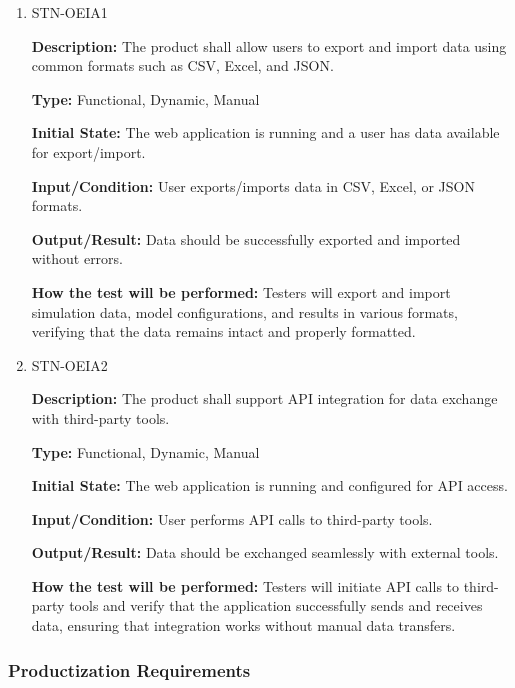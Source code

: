 \documentclass[12pt, titlepage]{article}
\begin{document}
\begin{enumerate}

\item{STN-OEIA1\\}

\textbf{Description:} The product shall allow users to export and import data using common formats such as CSV, Excel, and JSON.

\textbf{Type:} Functional, Dynamic, Manual

\textbf{Initial State:} The web application is running and a user has data available for export/import.

\textbf{Input/Condition:} User exports/imports data in CSV, Excel, or JSON formats.

\textbf{Output/Result:} Data should be successfully exported and imported without errors.

\textbf{How the test will be performed:} Testers will export and import simulation data, model configurations, and results in various formats, verifying that the data remains intact and properly formatted.

\item{STN-OEIA2\\}

\textbf{Description:} The product shall support API integration for data exchange with third-party tools.

\textbf{Type:} Functional, Dynamic, Manual

\textbf{Initial State:} The web application is running and configured for API access.

\textbf{Input/Condition:} User performs API calls to third-party tools.

\textbf{Output/Result:} Data should be exchanged seamlessly with external tools.

\textbf{How the test will be performed:} Testers will initiate API calls to third-party tools and verify that the application successfully sends and receives data, ensuring that integration works without manual data transfers.

\end{enumerate}

\subsubsection{Productization Requirements}
\end{document}
